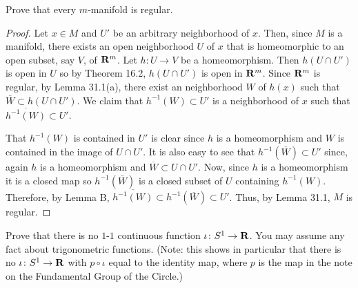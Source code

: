 \newpage
\begin{problem}[(B)]
Prove that every $m$-manifold is regular.
\end{problem}
\begin{proof}
Let $x\in M$ and $U'$ be an arbitrary
neighborhood of $x$. Then, since $M$ is a manifold, there exists an open
neighborhood $U$ of $x$ that is homeomorphic to an open subset, say $V$, of
$\mathbf{R}^m$. Let $h\colon U\to V$ be a homeomorphism. Then $h(U\cap U')$ is
open in $U$ so by Theorem 16.2, $h(U\cap U')$ is open in
$\mathbf{R}^m$. Since $\mathbf{R}^m$ is regular, by Lemma 31.1(a), there exist an
neighborhood $W$ of $h(x)$ such that $\overline W\subset h(U\cap U')$. We
claim that $h^{-1}(W)\subset U'$ is a neighborhood of $x$ such
that $\overline{h^{-1}(W)}\subset U'$.

That $h^{-1}(W)$ is contained in $U'$ is clear since $h$ is a
homeomorphism and $W$ is contained in the image of $U\cap U'$. It is also
easy to see that $h^{-1}(\overline{W})\subset U'$ since, again $h$ is a
homeomorphism and $\overline W\subset U\cap U'$. Now, since $h$ is a
homeomorphism it is a closed map so $h^{-1}(\overline W)$ is a closed
subset of $U$ containing $h^{-1}(W)$. Therefore, by Lemma B,
$\overline{h^{-1}(W)}\subset h^{-1}(\overline{W})\subset U'$. Thus, by
Lemma 31.1, $M$ is regular.
\end{proof}
\newpage
\begin{problem}[(C)]
Prove that there is no $1$-$1$ continuous function $\iota\colon
S^1\to\mathbf{R}$. You may assume any fact about trigonometric
functions. (Note: this shows in particular that there is no
$\iota\colon S^1\to\mathbf{R}$ with $p\circ\iota$ equal to the identity
map, where $p$ is the map in the note on the Fundamental Group of
the Circle.)
\end{problem}
